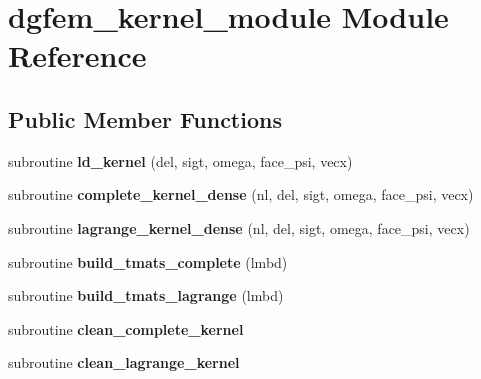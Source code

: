 \hypertarget{classdgfem__kernel__module}{\section{dgfem\+\_\+kernel\+\_\+module Module Reference}
\label{classdgfem__kernel__module}
}
\subsection*{Public Member Functions}
\begin{DoxyCompactItemize}
\item 
\hypertarget{classdgfem__kernel__module_ab2895739fbca15c13bfc209f2a9f56c1}{subroutine {\bfseries ld\+\_\+kernel} (del, sigt, omega, face\+\_\+psi, vecx)}\label{classdgfem__kernel__module_ab2895739fbca15c13bfc209f2a9f56c1}

\item 
\hypertarget{classdgfem__kernel__module_ae9af8c276042e07c95df3223a2efba18}{subroutine {\bfseries complete\+\_\+kernel\+\_\+dense} (nl, del, sigt, omega, face\+\_\+psi, vecx)}\label{classdgfem__kernel__module_ae9af8c276042e07c95df3223a2efba18}

\item 
\hypertarget{classdgfem__kernel__module_a695419069631a5882cef0dd9320ef81b}{subroutine {\bfseries lagrange\+\_\+kernel\+\_\+dense} (nl, del, sigt, omega, face\+\_\+psi, vecx)}\label{classdgfem__kernel__module_a695419069631a5882cef0dd9320ef81b}

\item 
\hypertarget{classdgfem__kernel__module_ae8f2982412ffa7c942882499aee04ffd}{subroutine {\bfseries build\+\_\+tmats\+\_\+complete} (lmbd)}\label{classdgfem__kernel__module_ae8f2982412ffa7c942882499aee04ffd}

\item 
\hypertarget{classdgfem__kernel__module_a5c329bf38a7b02608a8bbc8daba555ca}{subroutine {\bfseries build\+\_\+tmats\+\_\+lagrange} (lmbd)}\label{classdgfem__kernel__module_a5c329bf38a7b02608a8bbc8daba555ca}

\item 
\hypertarget{classdgfem__kernel__module_a9dd092be0f5af7f7456a89a064dc8efe}{subroutine {\bfseries clean\+\_\+complete\+\_\+kernel}}\label{classdgfem__kernel__module_a9dd092be0f5af7f7456a89a064dc8efe}

\item 
\hypertarget{classdgfem__kernel__module_a4cc0ad331dffcc26358eeb4a99ab36ac}{subroutine {\bfseries clean\+\_\+lagrange\+\_\+kernel}}\label{classdgfem__kernel__module_a4cc0ad331dffcc26358eeb4a99ab36ac}


\end{DoxyCompactItemize}
